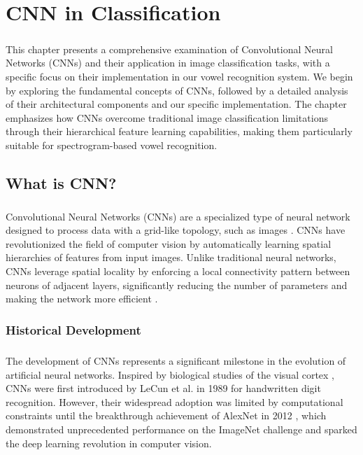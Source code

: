 
\chapter{CNN in Classification}
\label{chp:cnn}

\paragraph{}
This chapter presents a comprehensive examination of Convolutional Neural Networks (CNNs) and their application in image classification tasks, with a specific focus on their implementation in our vowel recognition system. We begin by exploring the fundamental concepts of CNNs, followed by a detailed analysis of their architectural components and our specific implementation. The chapter emphasizes how CNNs overcome traditional image classification limitations through their hierarchical feature learning capabilities, making them particularly suitable for spectrogram-based vowel recognition.

\section{What is CNN?}
\label{sec:what-is-cnn}

\paragraph{}
Convolutional Neural Networks (CNNs) are a specialized type of neural network designed to process data with a grid-like topology, such as images \cite{lecun1989backpropagation}. CNNs have revolutionized the field of computer vision by automatically learning spatial hierarchies of features from input images. Unlike traditional neural networks, CNNs leverage spatial locality by enforcing a local connectivity pattern between neurons of adjacent layers, significantly reducing the number of parameters and making the network more efficient \cite{krizhevsky2012imagenet}.

\subsection{Historical Development}
\paragraph{}
The development of CNNs represents a significant milestone in the evolution of artificial neural networks. Inspired by biological studies of the visual cortex \cite{hubel1968receptive}, CNNs were first introduced by LeCun et al. in 1989 \cite{lecun1989backpropagation} for handwritten digit recognition. However, their widespread adoption was limited by computational constraints until the breakthrough achievement of AlexNet in 2012 \cite{krizhevsky2012imagenet}, which demonstrated unprecedented performance on the ImageNet challenge and sparked the deep learning revolution in computer vision.

